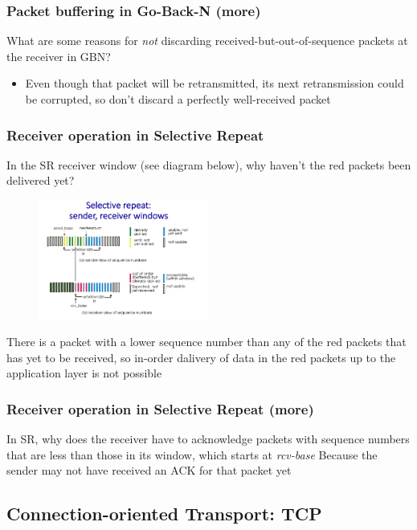     \subsubsection*{Packet buffering in Go-Back-N (more)}
    \noindent What are some reasons for \textit{not} discarding received-but-out-of-sequence packets at the receiver in GBN?
    \begin{itemize}
        \item Even though that packet will be retransmitted, its next retransmission could be corrupted, so don't discard
        a perfectly well-received packet
    \end{itemize}

    \subsubsection*{Receiver operation in Selective Repeat}
    \noindent In the SR receiver window (see diagram below), why haven't the red packets been delivered yet?
    \begin{figure}[H]
        \centering
        \includegraphics[width=0.5\textwidth]{img/3.4.13.jpg}
        \label{fig:SR}
    \end{figure}
    There is a packet with a lower sequence number than any of the red packets that has yet to be received, so in-order dalivery
    of data in the red packets up to the application layer is not possible

    \subsubsection*{Receiver operation in Selective Repeat (more)}
    \noindent In SR, why does the receiver have to acknowledge packets with sequence numbers that are less than those in its 
    window, which starts at \textit{rcv-base}
    Because the sender may not have received an ACK for that packet yet


\subsection*{Connection-oriented Transport: TCP}
